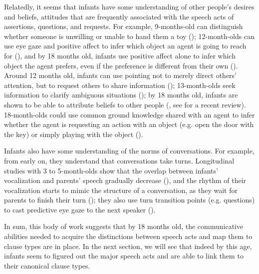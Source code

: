 Relatedly, it seems that infants have some understanding of other people's desires and beliefs, attitudes that are frequently associated with the speech acts of assertions, questions, and requests. For example, 9-months-old can distinguish whether someone is unwilling or unable to hand them a toy (\cite{behne2005goal}); 12-month-olds can use eye gaze and positive affect to infer which object an agent is going to reach for (\cite{phillips2002gaze}), and by 18 months old, infants use positive affect alone to infer which object the agent prefers, even if the preference is different from their own (\cite{repacholi1997desire}). Around 12 months old, infants can use pointing not to merely direct others' attention, but to request others to share information (\cite{kovacs2014request}); 13-month-olds seek information to clarify ambiguous situations (\cite{vaish2011request}); by 18 months old, infants are shown to be able to attribute beliefs to other people (\cite{onishi2005tom,surian2007tom,song2008earlytom,song2008false, scott2009tom,perner2012earlytom}, see \cite{scott2017review} for a recent review). 18-month-olds could use common ground knowledge shared with an agent to infer whether the agent is requesting an action with an object (e.g. open the door with the key) or simply playing with the object (\cite{schulze2015indirect}).%
 


Infants also have some understanding of the norms of conversations. For example, from early on, they understand that conversations take turns. Longitudinal studies with 3 to 5-month-olds show that the overlap between infants' vocalization and parents' speech gradually decrease (\cite{hilbrink2013turn3mo}), and the rhythm of their vocalization starts to mimic the structure of a conversation, as they wait for parents to finish their turn (\cite{hilbrink2013turn,hilbrink2015,casillas2016corpus}); they also use turn transition points (e.g. questions) to cast predictive eye gaze to the next speaker (\cite{casillas2017turn}).

 
 
In sum, this body of work suggests that by 18 months old, the communicative abilities needed to acquire the distinctions between speech acts and map them to clause types are in place. In the next section, we will see that indeed by this age, infants seem to figured out the major speech acts and are able to link them to their canonical clause types.



